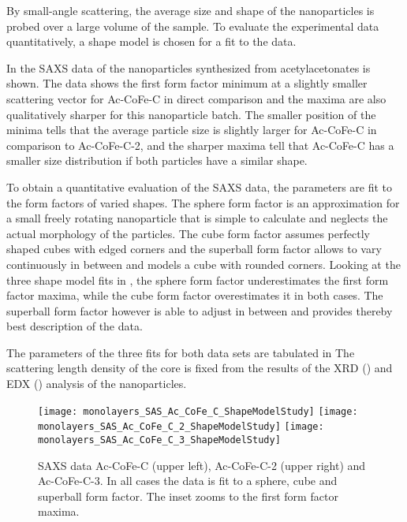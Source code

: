 \documentclass[\main/dresen_thesis.tex]{subfiles}
\begin{document}
  \label{sec:monolayers:nanoparticle:sas}

  By small-angle scattering, the average size and shape of the nanoparticles is probed over a large volume of the sample.
  To evaluate the experimental data quantitatively, a shape model is chosen for a fit to the data.

    In  the SAXS data of the nanoparticles synthesized from acetylacetonates is shown.
    The data shows the first form factor minimum at a slightly smaller scattering vector for Ac-CoFe-C in direct comparison and the maxima are also qualitatively sharper for this nanoparticle batch.
    The smaller position of the minima tells that the average particle size is slightly larger for Ac-CoFe-C in comparison to Ac-CoFe-C-2, and the sharper maxima tell that Ac-CoFe-C has a smaller size distribution if both particles have a similar shape.

    To obtain a quantitative evaluation of the SAXS data, the parameters are fit to the form factors of varied shapes.
    The sphere form factor is an approximation for a small freely rotating nanoparticle that is simple to calculate and neglects the actual morphology of the particles.
    The cube form factor assumes perfectly shaped cubes with edged corners and the superball form factor allows to vary continuously in between and models a cube with rounded corners.
    Looking at the three shape model fits in , the sphere form factor underestimates the first form factor maxima, while the cube form factor overestimates it in both cases.
    The superball form factor however is able to adjust in between and provides thereby best description of the data.

    The parameters of the three fits for both data sets are tabulated in 
    The scattering length density of the core is fixed from the results of the XRD () and EDX () analysis of the nanoparticles.


    \begin{figure}[!htbp]
      \centering
      \texttt{[image: monolayers\_SAS\_Ac\_CoFe\_C\_ShapeModelStudy]}
      \texttt{[image: monolayers\_SAS\_Ac\_CoFe\_C\_2\_ShapeModelStudy]}
      \texttt{[image: monolayers\_SAS\_Ac\_CoFe\_C\_3\_ShapeModelStudy]}
      \caption{\label{fig:monolayers:nanoparticle:sas:AcAcCoFeC}SAXS data Ac-CoFe-C (upper left), Ac-CoFe-C-2 (upper right) and Ac-CoFe-C-3. In all cases the data is fit to a sphere, cube and superball form factor. The inset zooms to the first form factor maxima.}
    \end{figure}
\end{document}
